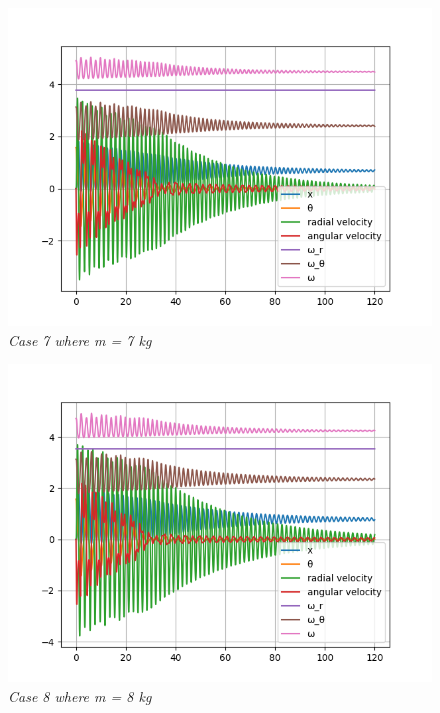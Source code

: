 \begin{figure}[H]
    \centering
    \includegraphics[width=15cm]{SimPictures/m7.png}
    \caption{\textit{Case 7 where m = 7 kg}}
    \label{}
\end{figure}
        
\begin{figure}[H]
    \centering
    \includegraphics[width=15cm]{SimPictures/m8.png}
    \caption{\textit{Case 8 where m = 8 kg}}
    \label{}
\end{figure}
        
